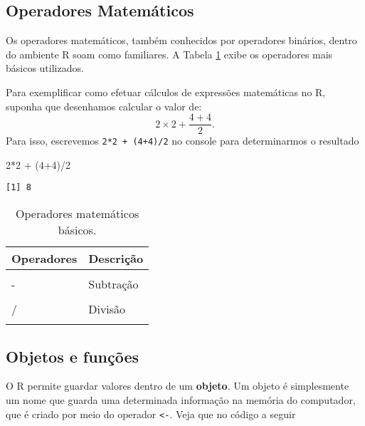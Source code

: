 \documentclass[
  12pt,
  letterpaper,
  DIV=11,
  numbers=noendperiod]{scrreprt}
\newenvironment{Shaded}{\begin{snugshade}}{\end{snugshade}}
\newcommand{\DecValTok}[1]{\textcolor[rgb]{0.68,0.00,0.00}{#1}}
\newcommand{\NormalTok}[1]{\textcolor[rgb]{0.00,0.23,0.31}{#1}}
\newcommand{\SpecialCharTok}[1]{\textcolor[rgb]{0.37,0.37,0.37}{#1}}
\begin{document}
\subsection{Operadores Matemáticos}\label{operadores-matemuxe1ticos}

Os operadores matemáticos, também conhecidos por operadores binários,
dentro do ambiente R soam como familiares. A Tabela \ref{tbl-op-mat}
exibe os operadores mais básicos utilizados.

Para exemplificar como efetuar cálculos de expressões matemáticas no R,
suponha que desenhamos calcular o valor de:
\[2\times 2 + \frac{4 + 4}{2}.\] Para isso, escrevemos
\texttt{2*2\ +\ (4+4)/2} no console para determinarmos o resultado

\begin{Shaded}
\begin{Highlighting}[]
\DecValTok{2}\SpecialCharTok{*}\DecValTok{2} \SpecialCharTok{+}\NormalTok{ (}\DecValTok{4}\SpecialCharTok{+}\DecValTok{4}\NormalTok{)}\SpecialCharTok{/}\DecValTok{2}
\end{Highlighting}
\end{Shaded}

\begin{verbatim}
[1] 8
\end{verbatim}

\begin{longtable}[t]{ll}

\caption{\label{tbl-op-mat}Operadores matemáticos básicos.}

\tabularnewline

\toprule
Operadores & Descrição\\
\midrule
\cellcolor{gray!10}{+} & \cellcolor{gray!10}{Adição}\\
- & Subtração\\
\cellcolor{gray!10}{*} & \cellcolor{gray!10}{Multiplicação}\\
/ & Divisão\\
\cellcolor{gray!10}{\textasciicircum{}} & \cellcolor{gray!10}{Exponenciação}\\
\bottomrule

\end{longtable}

\subsection{Objetos e funções}\label{objetos-e-funuxe7uxf5es}

O R permite guardar valores dentro de um \textbf{objeto}. Um objeto é
simplesmente um nome que guarda uma determinada informação na memória do
computador, que é criado por meio do operador \texttt{\textless{}-}.
Veja que no código a seguir
\end{document}
